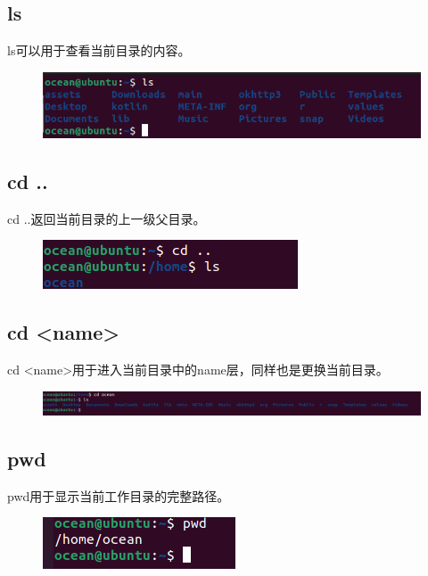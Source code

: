 \documentclass{article}
\begin{document}
\subsection{ls}
ls可以用于查看当前目录的内容。
\begin{figure}[H]
    \centering
    \includegraphics[width=1\linewidth]{ls.png}
\end{figure}

\subsection{cd ..}
cd ..返回当前目录的上一级父目录。
\begin{figure}[H]
    \centering
    \includegraphics[width=1\linewidth]{cd1.png}
\end{figure}

\subsection{cd <name>}
cd <name>用于进入当前目录中的name层，同样也是更换当前目录。
\begin{figure}[H]
    \centering
    \includegraphics[width=1\linewidth]{cd2.png}
\end{figure}

\subsection{pwd}
pwd用于显示当前工作目录的完整路径。
\begin{figure}[H]
    \centering
    \includegraphics[width=1\linewidth]{pwd.png}
\end{figure}
\end{document}
